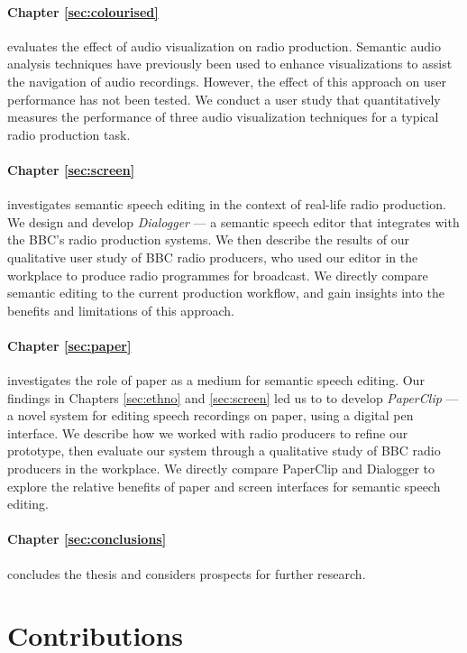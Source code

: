 \paragraph{Chapter \ref{sec:colourised}} evaluates the effect of audio visualization on radio production.  Semantic
audio analysis techniques have previously been used to enhance visualizations to assist the navigation of audio
recordings. However, the effect of this approach on user performance has not been tested.  We conduct a user study that
quantitatively measures the performance of three audio visualization techniques for a typical radio production task.

\paragraph{Chapter \ref{sec:screen}} investigates semantic speech editing in the context of real-life radio production.
We design and develop \textit{Dialogger} --- a semantic speech editor that integrates with the BBC's radio production
systems.  We then describe the results of our qualitative user study of BBC radio producers, who used our editor in the
workplace to produce radio programmes for broadcast.  We directly compare semantic editing to the current production
workflow, and gain insights into the benefits and limitations of this approach.

\paragraph{Chapter \ref{sec:paper}} investigates the role of paper as a medium for semantic speech editing.  Our
findings in Chapters \ref{sec:ethno} and \ref{sec:screen} led us to to develop \textit{PaperClip} --- a novel system
for editing speech recordings on paper, using a digital pen interface. We describe how we worked with radio producers
to refine our prototype, then evaluate our system through a qualitative study of BBC radio producers in the workplace.
We directly compare PaperClip and Dialogger to explore the relative benefits of paper and screen interfaces for
semantic speech editing.

\paragraph{Chapter \ref{sec:conclusions}} concludes the thesis and considers prospects for further research.

\section{Contributions}\label{sec:intro-contributions}






